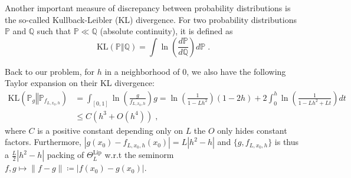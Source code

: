 \documentclass[10pt]{article} %
\newcommand{\Prob}[0]{\mathbb{P}}
\newcommand\kl[2]{\mathrm{KL}\left( \left. {#1}\right\Vert {#2} \right)}
\newcommand\p[1]{\left( {#1}\right)}
\begin{document}
Another important measure of discrepancy between probability distributions is the so-called Kullback-Leibler (KL) divergence. For two probability distributions $\mathbb{P}$ and $\mathbb{Q}$ such that $\mathbb{P} \ll \mathbb{Q}$ (absolute continuity),  it is defined as
\begin{equation*}
    \kl{\mathbb{P}}{\mathbb{Q}} = \int \ln \p{\frac{d \mathbb{P}}{ d \mathbb{Q}}} d\mathbb{P} \;.
\end{equation*}

Back to our problem, for $h$ in a neighborhood of $0$, we also have the following Taylor expansion on their KL divergence:
\begin{equation}
\label{eq:dsqlkvjdfhvnqgzsera}
\begin{aligned}
    \kl{\Prob_{g}}{\Prob_{f_{L, x_0, h}}} 
    &= 
    \int_{[0, 1]}\ln \p{\frac{g}{f_{L, x_0, h}}} g 
    =
    \ln\p{\frac{1}{1-Lh^2}} (1-2h) + 2 \int_0^h \ln \p{\frac{1}{1-Lh^2 + Lt} } dt \\
    &\leq
    C \p{h^3 + O(h^4)} \;,
\end{aligned}
\end{equation}
where $C$ is a positive constant depending only on $L$ the $O$ only hides constant factors.
Furthermore, $|g(x_0) - f_{L, x_0, h}(x_0)| = L |h^2-h|$ and $\{g, f_{L, x_0, h}\}$ is thus a $\frac{L }{2} |h^2-h|$ packing of $\Theta^{\text{Lip}}_L$ w.r.t the seminorm $f, g \mapsto \|f-g\| \coloneqq |f(x_0) - g(x_0)|$.
\end{document}
